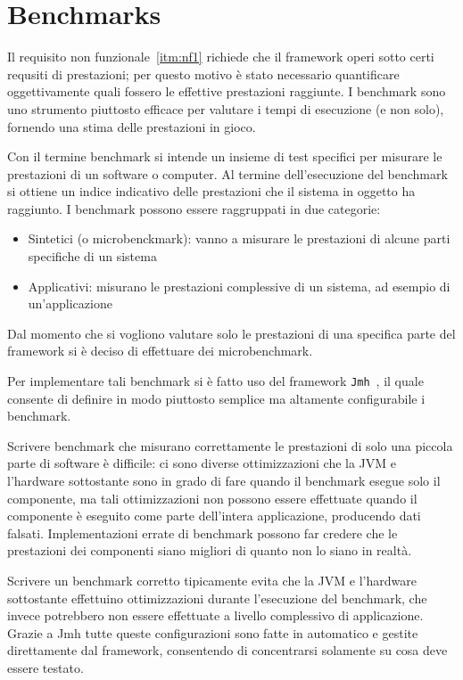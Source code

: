 \section{Benchmarks}\label{sec:benchmarks}
Il requisito non funzionale~\ref{itm:nf1} richiede che il framework operi sotto certi requsiti di prestazioni;
per questo motivo è stato necessario quantificare oggettivamente quali fossero le effettive prestazioni raggiunte.
I benchmark sono uno strumento piuttosto efficace per valutare i tempi di esecuzione (e non solo), fornendo
una stima delle prestazioni in gioco.

Con il termine benchmark si intende un insieme di test specifici per misurare le prestazioni di un software o computer.
Al termine dell'esecuzione del benchmark si ottiene un indice indicativo delle prestazioni che il sistema in oggetto ha
raggiunto.
I benchmark possono essere raggruppati in due categorie:
\begin{itemize}
    \item Sintetici (o microbenckmark): vanno a misurare le prestazioni di alcune parti specifiche di un sistema
    \item Applicativi: misurano le prestazioni complessive di un sistema, ad esempio di un'applicazione
\end{itemize}

Dal momento che si vogliono valutare solo le prestazioni di una specifica parte del framework si è deciso di effettuare
dei microbenchmark.

Per implementare tali benchmark si è fatto uso del framework \texttt{Jmh}~\cite{jmh}, il quale consente di definire in
modo piuttosto semplice ma altamente configurabile i benchmark.

Scrivere benchmark che misurano correttamente le prestazioni di solo una piccola parte di software è difficile: ci sono
diverse ottimizzazioni che la JVM e l'hardware sottostante sono in grado di fare quando il benchmark esegue solo il
componente, ma tali ottimizzazioni non possono essere effettuate quando il componente è eseguito come parte dell'intera
applicazione, producendo dati falsati.
Implementazioni errate di benchmark possono far credere che le prestazioni dei componenti siano migliori di quanto non
lo siano in realtà.

Scrivere un benchmark corretto tipicamente evita che la JVM e l'hardware sottostante effettuino ottimizzazioni
durante l'esecuzione del benchmark, che invece potrebbero non essere effettuate a livello complessivo di
applicazione.
Grazie a Jmh tutte queste configurazioni sono fatte in automatico e gestite direttamente dal framework, consentendo di
concentrarsi solamente su cosa deve essere testato.

